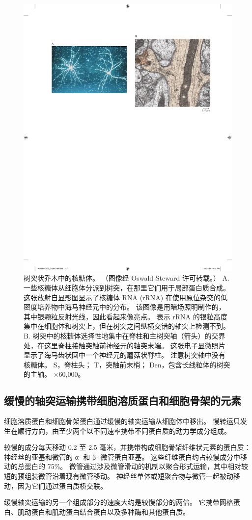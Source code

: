 \begin{figure}[htbp]
	\centering
	\includegraphics[width=0.5\linewidth]{chap07/fig_7_12}
	\caption{树突状乔木中的核糖体。 （图像经 Oswald Steward 许可转载。） A. 一些核糖体从细胞体分派到树突，在那里它们用于局部蛋白质合成。 这张放射自显影图显示了核糖体 RNA (rRNA) 在使用原位杂交的低密度培养物中海马神经元中的分布。 该图像是用暗场照明制作的，其中银颗粒反射光线，因此看起来像亮点。 表示 rRNA 的银粒高度集中在细胞体和树突上，但在树突之间纵横交错的轴突上检测不到。 B. 树突中的核糖体选择性地集中在脊柱和主树突轴（箭头）的交界处，在这里脊柱接触突触前神经元的轴突末端。 这张电子显微照片显示了海马齿状回中一个神经元的蘑菇状脊柱。 注意树突轴中没有核糖体。 S，脊柱头； T，突触前末梢； Den，包含长线粒体的树突的主轴。 ×60,000。}
	\label{fig:7_12}
\end{figure}


\subsection{缓慢的轴突运输携带细胞溶质蛋白和细胞骨架的元素}

细胞溶质蛋白和细胞骨架蛋白通过缓慢的轴突运输从细胞体中移出。 
慢转运只发生在顺行方向，由至少两个以不同速率携带不同蛋白质的动力学成分组成。


较慢的成分每天移动 0.2 至 2.5 毫米，并携带构成细胞骨架纤维状元素的蛋白质：神经丝的亚基和微管的 α- 和 β- 微管蛋白亚基。 这些纤维蛋白约占较慢成分中移动的总蛋白的 75\%。 
微管通过涉及微管滑动的机制以聚合形式运输，其中相对较短的预组装微管沿着现有微管移动。 
神经丝单体或短聚合物与微管一起被动移动，因为它们通过蛋白质桥交联。


缓慢轴突运输的另一个组成部分的速度大约是较慢部分的两倍。 
它携带网格蛋白、肌动蛋白和肌动蛋白结合蛋白以及多种酶和其他蛋白质。


